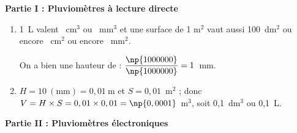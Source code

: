 
\medskip

%
% 
%


\textbf{Partie I : Pluviomètres à lecture directe}

\medskip

%

\begin{enumerate}
\item %
1~L valent ~cm$^3$ ou ~mm$^3$ et une surface de 1 m$^2$ vaut aussi 100~dm$^2$ ou encore ~cm$^2$ ou encore ~mm$^2$.

On a bien une hauteur de : $\dfrac{\np{1000000}}{\np{1000000}} = 1$~mm.
\item %

$H = 10~(\text{mm}) = 0,01~\text{m}$ et $S = 0,01$~m$^2$ ; donc $V = H \times S = 0,01 \times 0,01 = \np{0,0001}$~m$^3$, soit 0,1~dm$^3$ ou 0,1~L.
\end{enumerate}

\medskip

\textbf{Partie II : Pluviomètres électroniques}

\medskip

